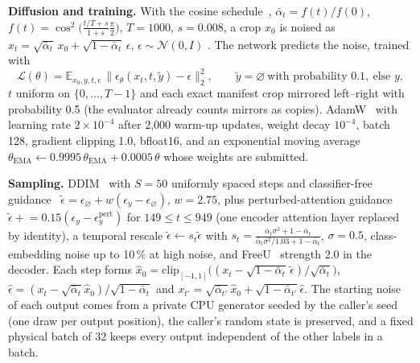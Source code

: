 \documentclass[10pt]{article}
\begin{document}
\textbf{Diffusion and training.} With the cosine schedule~\cite{nichol2021improved}, $\bar\alpha_t=f(t)/f(0)$, $f(t)=\cos^2\!\big(\tfrac{t/T+s}{1+s}\tfrac{\pi}{2}\big)$, $T{=}1000$, $s{=}0.008$, a crop $x_0$ is noised as $x_t=\sqrt{\bar\alpha_t}\,x_0+\sqrt{1-\bar\alpha_t}\,\epsilon$, $\epsilon\sim\mathcal N(0,I)$ \cite{ho2020ddpm}. The network predicts the noise, trained with
\begin{equation}
\mathcal L(\theta)=\mathbb E_{x_0,y,t,\epsilon}\,\big\|\epsilon_\theta(x_t,t,\tilde y)-\epsilon\big\|_2^2,\qquad \tilde y=\varnothing\ \text{with probability }0.1,\ \text{else } y,
\end{equation}
$t$ uniform on $\{0,\dots,T{-}1\}$ and each exact manifest crop mirrored left--right with probability 0.5 (the evaluator already counts mirrors as copies). AdamW~\cite{loshchilov2019adamw} with learning rate $2{\times}10^{-4}$ after 2{,}000 warm-up updates, weight decay $10^{-4}$, batch 128, gradient clipping 1.0, bfloat16, and an exponential moving average $\theta_{\text{EMA}}\leftarrow0.9995\,\theta_{\text{EMA}}+0.0005\,\theta$ whose weights are submitted.

\textbf{Sampling.} DDIM~\cite{song2020ddim} with $S{=}50$ uniformly spaced steps and classifier-free guidance~\cite{ho2022cfg} $\tilde\epsilon=\epsilon_\varnothing+w(\epsilon_y-\epsilon_\varnothing)$, $w{=}2.75$, plus perturbed-attention guidance~\cite{ahn2024pag} $\tilde\epsilon\mathrel{+}=0.15(\epsilon_y-\epsilon_y^{\text{pert}})$ for $149\le t\le949$ (one encoder attention layer replaced by identity), a temporal rescale $\tilde\epsilon\leftarrow s_t\tilde\epsilon$ with $s_t=\frac{\bar\alpha_t\sigma^2+1-\bar\alpha_t}{\bar\alpha_t\sigma^2/1.03+1-\bar\alpha_t}$, $\sigma{=}0.5$, class-embedding noise up to 10\,\% at high noise, and FreeU~\cite{si2024freeu} strength 2.0 in the decoder. Each step forms $\hat x_0=\mathrm{clip}_{[-1,1]}\big((x_t-\sqrt{1-\bar\alpha_t}\,\tilde\epsilon)/\sqrt{\bar\alpha_t}\big)$, $\hat\epsilon=(x_t-\sqrt{\bar\alpha_t}\hat x_0)/\sqrt{1-\bar\alpha_t}$ and $x_{t'}=\sqrt{\bar\alpha_{t'}}\hat x_0+\sqrt{1-\bar\alpha_{t'}}\hat\epsilon$. The starting noise of each output comes from a private CPU generator seeded by the caller's seed (one draw per output position), the caller's random state is preserved, and a fixed physical batch of 32 keeps every output independent of the other labels in a batch.
\end{document}
